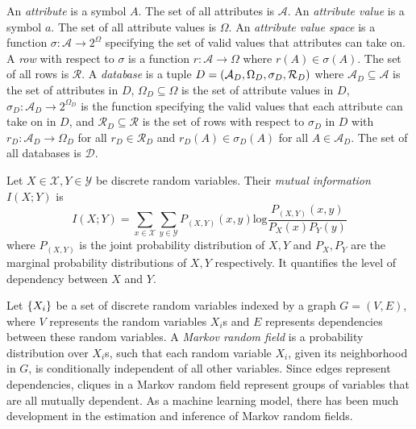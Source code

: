 \documentclass[manuscript,screen,review,anonymous]{acmart}
\DeclarePairedDelimiter{\set}{\{}{\}}
\DeclarePairedDelimiter{\tuple}{(}{)}
\renewcommand{\implies}{\rightarrow}
\newcommand{\db}{D}
\newcommand{\dbs}{\mathcal{D}}
\newcommand{\mi}[2]{I(#1;#2)}
\newcommand{\entropy}[1]{H(#1)}
\begin{document}
An \emph{attribute} is a symbol $A$.
The set of all attributes is $\mathcal{A}$.
An \emph{attribute value} is a symbol $a$.
The set of all attribute values is $\Omega$.
An \emph{attribute value space} is a function $\sigma : \mathcal{A} \implies 2^{\Omega}$
specifying the set of valid values that attributes can take on.
A \emph{row} with respect to $\sigma$
is a function $r : \mathcal{A} \implies \Omega$
where $r(A) \in \sigma(A)$.
The set of all rows is $\mathcal{R}$.
A \emph{database} is a tuple $\db =
\tuple{
    \mathcal{A}_{\db},
    \Omega_{\db},
    \sigma_{\db},
    \mathcal{R}_{\db}
}$
where
$\mathcal{A}_{\db} \subseteq \mathcal{A}$
is the set of attributes in $\db$,
$\Omega_{\db} \subseteq \Omega$
is the set of attribute values in $\db$,
$\sigma_{\db} : \mathcal{A}_{\db} \implies 2^{\Omega_{\db}}$
is the function specifying the valid values that each attribute can take on in $\db$,
and $\mathcal{R}_{\db} \subseteq \mathcal{R}$
is the set of rows with respect to $\sigma_{\db}$ in $\db$
with $r_\db : \mathcal{A}_\db \implies \Omega_\db$
for all $r_\db \in \mathcal{R}_\db$
and $r_\db(A) \in \sigma_\db(A)$
for all $A \in \mathcal{A}_\db$.
The set of all databases is $\dbs$.

Let $X \in \mathcal{X},Y \in \mathcal{Y}$ be discrete random variables. Their \emph{mutual information} $\mi{X}{Y}$ is
\[
\mi{X}{Y} = \sum_{x \in \mathcal{X}} \sum_{y \in \mathcal{Y}} P_{(X,Y)}(x,y) \text{log} \frac{P_{(X,Y)}(x,y)}{P_X(x)P_Y(y)}
\]
where $P_{(X,Y)}$ is the joint probability distribution of $X,Y$ and $P_X,P_Y$ are the marginal probability distributions of $X,Y$ respectively.
It quantifies the level of dependency between $X$ and $Y$.

Let $\set{X_i}$ be a set of discrete random variables indexed by a graph $G = (V,E)$, where $V$ represents the random variables $X_i$s and $E$ represents dependencies between these random variables. A \emph{Markov random field} is a probability distribution over $X_i$s, such that each random variable $X_i$, given its neighborhood in $G$, is conditionally independent of all other variables. Since edges represent dependencies, cliques in a Markov random field represent groups of variables that are all mutually dependent. As a machine learning model, there has been much development in the estimation and inference of Markov random fields\cite{koller2009probabilistic,murphy2023probabilistic}.
\end{document}

